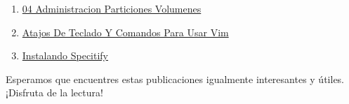 \documentclass[
  jou,
  floatsintext,
  longtable,
  a4paper,
  nolmodern,
  notxfonts,
  notimes,
  colorlinks=true,linkcolor=blue,citecolor=blue,urlcolor=blue]{apa7}
\begin{document}
\begin{enumerate}
{  Instalacion Linux}
\item
  \href{https://achalmaedison.netlify.app/tecnologia-seguridad/operating-system/2023-06-20-04-administracion-particiones-volumenes/index.pdf}{}
  \href{https://achalmaedison.netlify.app/tecnologia-seguridad/operating-system/2023-06-20-04-administracion-particiones-volumenes}{04
  Administracion Particiones Volumenes}
\item
  \href{https://achalmaedison.netlify.app/tecnologia-seguridad/operating-system/2023-07-01-atajos-de-teclado-y-comandos-para-usar-vim/index.pdf}{}
  \href{https://achalmaedison.netlify.app/tecnologia-seguridad/operating-system/2023-07-01-atajos-de-teclado-y-comandos-para-usar-vim}{Atajos
  De Teclado Y Comandos Para Usar Vim}
\item
  \href{https://achalmaedison.netlify.app/tecnologia-seguridad/operating-system/2024-07-15-instalando-specitify/index.pdf}{}
  \href{https://achalmaedison.netlify.app/tecnologia-seguridad/operating-system/2024-07-15-instalando-specitify}{Instalando
  Specitify}
\end{enumerate}

Esperamos que encuentres estas publicaciones igualmente interesantes y
útiles. ¡Disfruta de la lectura!
\end{document}
